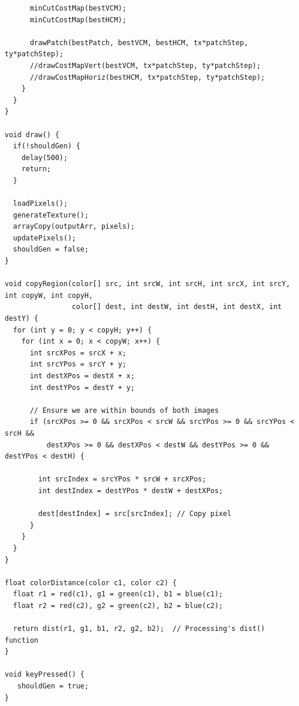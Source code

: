 \documentclass[a4paper, 11pt, titlepage]{article}
\begin{document}
\begin{lstlisting}
      minCutCostMap(bestVCM);
      minCutCostMap(bestHCM);
      
      drawPatch(bestPatch, bestVCM, bestHCM, tx*patchStep, ty*patchStep);
      //drawCostMapVert(bestVCM, tx*patchStep, ty*patchStep);
      //drawCostMapHoriz(bestHCM, tx*patchStep, ty*patchStep);
    }
  }
}

void draw() {
  if(!shouldGen) {
    delay(500);
    return;
  }
  
  loadPixels();
  generateTexture();
  arrayCopy(outputArr, pixels);
  updatePixels();
  shouldGen = false;
}

void copyRegion(color[] src, int srcW, int srcH, int srcX, int srcY, int copyW, int copyH, 
                color[] dest, int destW, int destH, int destX, int destY) {
  for (int y = 0; y < copyH; y++) {
    for (int x = 0; x < copyW; x++) {
      int srcXPos = srcX + x;
      int srcYPos = srcY + y;
      int destXPos = destX + x;
      int destYPos = destY + y;

      // Ensure we are within bounds of both images
      if (srcXPos >= 0 && srcXPos < srcW && srcYPos >= 0 && srcYPos < srcH &&
          destXPos >= 0 && destXPos < destW && destYPos >= 0 && destYPos < destH) {
        
        int srcIndex = srcYPos * srcW + srcXPos;
        int destIndex = destYPos * destW + destXPos;

        dest[destIndex] = src[srcIndex]; // Copy pixel
      }
    }
  }
}

float colorDistance(color c1, color c2) {
  float r1 = red(c1), g1 = green(c1), b1 = blue(c1);
  float r2 = red(c2), g2 = green(c2), b2 = blue(c2);
  
  return dist(r1, g1, b1, r2, g2, b2);  // Processing's dist() function
}

void keyPressed() {
   shouldGen = true;
}
\end{lstlisting}
\end{document}
